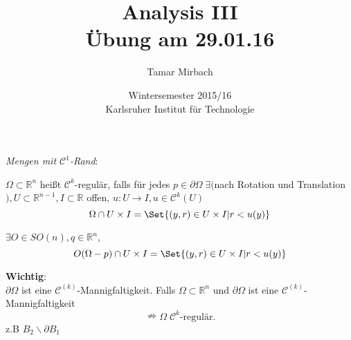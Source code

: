 \documentclass[11pt]{memoir}
\begin{document}
\title{\textbf{Analysis III}\\ Übung am 29.01.16}
\author{Tamar Mirbach}
\date{Wintersemester 2015/16\\ Karlsruher Institut für Technologie}

\maketitle


\emph{Mengen mit $\mathscr C^1$-Rand}: 
\par
$\Omega \subset \mathbb R^n$ heißt $\mathscr C^k$-regulär, falls für jedes $p \in \partial\Omega \; \exists ($nach Rotation und Translation$), U \subset \mathbb R^{n-1}, I \subset \mathbb R$ offen, $u: U \rightarrow I, u \in \mathscr C^k (U)$ 
$$\Omega \cap U \times I = \Set{(y,r) \in U \times I | r < u(y)}$$

$\exists O \in SO(n), q \in \mathbb R^n$, 
$$O(\Omega - p) \cap U \times I = \Set{(y,r) \in U \times I | r < u(y)}$$

\par

\textbf{Wichtig}: \\
$\partial\Omega$ ist eine $\mathscr C^{(k)}$-Mannigfaltigkeit. Falls $\Omega \subset \mathbb R^n$ und $\partial\Omega$ ist eine $\mathscr C^{(k)}$-Mannigfaltigkeit $$\nRightarrow \Omega \; \mathscr C^k \text{-regulär}.$$
z.B $B_2\backslash \partial B_1$

\par
\end{document}
